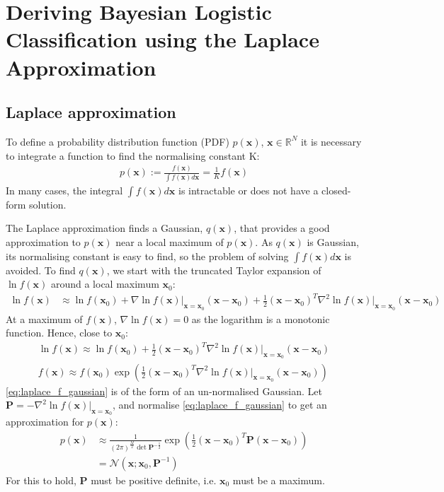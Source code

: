 \documentclass[a4paper]{article}
\begin{document}
    \newpage
    \appendix
    \section{Deriving Bayesian Logistic Classification using the Laplace Approximation}
    \label{app:derivation}

    \subsection{Laplace approximation}\label{sec:laplace-approximation}

    To define a probability distribution function (PDF) $p(\bm{x})$, $\bm{x} \in \mathbb{R}^N$ it is necessary to integrate a function to find the normalising constant K:
    \begin{align}
        p(\bm{x}) := \frac{f(\bm{x})}{\int f(\bm{x}) d\bm{x}} = \frac{1}{K} f(\bm{x})
    \end{align}
    In many cases, the integral $\int f(\bm{x}) d\bm{x}$ is intractable or does not have a closed-form solution.

    The Laplace approximation finds a Gaussian, $q(\bm{x})$, that provides a good approximation to $p(\bm{x})$ near a local maximum of $p(\bm{x})$.
    As $q(\bm{x})$ is Gaussian, its normalising constant is easy to find, so the problem of solving $\int f(\bm{x}) d\bm{x}$ is avoided.
    To find $q(\bm{x})$, we start with the truncated Taylor expansion of $\ln f(\bm{x})$ around a local maximum $\bm{x}_0$:
    \begin{align}
        \nonumber
        \ln f(\bm{x}) &\approx \ln f(\bm{x}_0) + \nabla \ln f(\bm{x}) \big|_{\bm{x} = \bm{x}_0} (\bm{x} - \bm{x}_0)
        + \frac{1}{2} (\bm{x} - \bm{x}_0)^T \nabla^2 \ln f(\bm{x}) \big|_{\bm{x} = \bm{x}_0} (\bm{x} - \bm{x}_0)
    \end{align}
    At a maximum of $f(\bm{x})$, $\nabla \ln f(\bm{x}) = 0$ as the logarithm is a monotonic function.
    Hence, close to $\bm{x}_0$:
    \begin{align}
        \ln f(\bm{x}) \approx \ln f(\bm{x}_0) + \frac{1}{2} (\bm{x} - \bm{x}_0)^T \nabla^2 \ln f(\bm{x}) \big|_{\bm{x} = \bm{x}_0} (\bm{x} - \bm{x}_0) \nonumber \\
        f(\bm{x}) \approx f(\bm{x}_0) \exp \left(\frac{1}{2} (\bm{x} - \bm{x}_0)^T \nabla^2 \ln f(\bm{x}) \big|_{\bm{x} = \bm{x}_0} (\bm{x} - \bm{x}_0) \right)
        \label{eq:laplace_f_gaussian}
    \end{align}
    \autoref{eq:laplace_f_gaussian} is of the form of an un-normalised Gaussian. Let $\bm{P} = -\nabla^2 \ln f(\bm{x})\big|_{\bm{x} = \bm{x}_0}$,
    and normalise \autoref{eq:laplace_f_gaussian} to get an approximation for $p(\bm{x})$:
    \begin{align}
        p(\bm{x}) &\approx \frac{1}{(2\pi)^\frac{M}{2} \det\bm{P}^{-\frac{1}{2}}} \exp \left(\frac{1}{2} (\bm{x} - \bm{x}_0)^T \bm{P} (\bm{x} - \bm{x}_0) \right) \nonumber \\
        &= \mathcal{N}(\bm{x}; \bm{x}_0, \bm{P}^{-1})
        \label{eq:laplace_approximation}
    \end{align}
    For this to hold, $\bm{P}$ must be positive definite, i.e. $\bm{x}_0$ must be a maximum.
\end{document}
